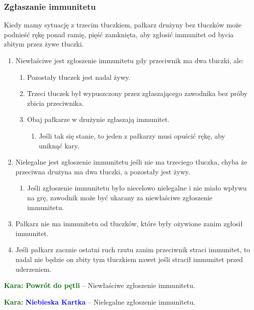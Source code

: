 \documentclass[11pt,a4paper]{article}
\newcommand\bluecard[1]{\bgroup\textcolor{darkgreen}{\textbf{Kara: }}\bgroup\textcolor{blue}{\textbf{Niebieska Kartka}} -- #1}
\newcommand\penaltyd[2]{\bgroup\textcolor{darkgreen}{\textbf{Kara: #1}} -- #2}
\begin{document}
\subsubsection{Zgłaszanie immunitetu}
Kiedy mamy sytuację z trzecim tłuczkiem, pałkarz drużyny bez tłuczków może podnieść rękę ponad ramię, pięść zamknięta, aby zgłosić immunitet od bycia zbitym przez żywe tłuczki.
\begin{enumerate}
  \item Niewłaściwe jest zgłoszenie immunitetu gdy przeciwnik ma dwa tłuczki, ale:
  \begin{enumerate}
    \item Pozostały tłuczek jest nadal żywy.
    \item Trzeci tłuczek był wypuszczony przez zgłaszającego zawodnika bez próby zbicia przeciwnika.
    \item Obaj pałkarze w drużynie zgłaszają immunitet.
    \begin{enumerate}
      \item Jeśli tak się stanie, to jeden z pałkarzy musi opuścić rękę, aby uniknąć kary.
    \end{enumerate}
  \end{enumerate}
  \item Nielegalne jest zgłoszenie immunitetu jeśli nie ma trzeciego tłuczka, chyba że przeciwna drużyna ma dwa tłuczki, a pozostały jest żywy.
  \begin{enumerate}
    \item Jeśli zgłoszenie immunitetu było niecelowo nielegalne i nie miało wpływu na grę, zawodnik może być ukarany za niewłaściwe zgłoszenie immunitetu.
  \end{enumerate}
  \item Pałkarz nie ma immunitetu od tłuczków, które były ożywione zanim zgłosił immunitet.
  \item Jeśli pałkarz zacznie ostatni ruch rzutu zanim przeciwnik straci immunitet, to nadal nie będzie on zbity tym tłuczkiem nawet jeśli stracił immunitet przed uderzeniem.
\end{enumerate}

\penaltyd{Powrót do pętli}{Niewłaściwe zgłoszenie immunitetu.}

\bluecard{Nielegalne zgłoszenie immunitetu.}
\end{document}
